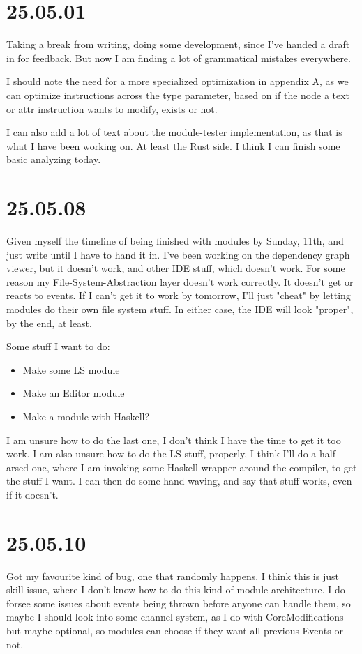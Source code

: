 \section{25.05.01}

Taking a break from writing, doing some development, since I've handed a draft
in for feedback. But now I am finding a lot of grammatical mistakes everywhere.

I should note the need for a more specialized optimization in appendix A, as
we can optimize instructions across the type parameter, based on if the node a
text or attr instruction wants to modify, exists or not.

I can also add a lot of text about the module-tester implementation, as that is
what I have been working on. At least the Rust side. I think I can finish some
basic analyzing today.

\section{25.05.08}

Given myself the timeline of being finished with modules by Sunday, 11th, and
just write until I have to hand it in. I've been working on the dependency graph
viewer, but it doesn't work, and other IDE stuff, which doesn't work. For some
reason my File-System-Abstraction layer doesn't work correctly. It doesn't get
or reacts to events. If I can't get it to work by tomorrow, I'll just "cheat" by
letting modules do their own file system stuff. In either case, the IDE will
look "proper", by the end, at least.

Some stuff I want to do:

\begin{itemize}
  \item Make some LS module
  \item Make an Editor module
  \item Make a module with Haskell?
\end{itemize}

I am unsure how to do the last one, I don't think I have the time to get it too
work. I am also unsure how to do the LS stuff, properly, I think I'll do a
half-arsed one, where I am invoking some Haskell wrapper around the compiler,
to get the stuff I want. I can then do some hand-waving, and say that stuff
works, even if it doesn't.


\section{25.05.10}

Got my favourite kind of bug, one that randomly happens. I think this is just
skill issue, where I don't know how to do this kind of module architecture. I
do forsee some issues about events being thrown before anyone can handle them,
so maybe I should look into some channel system, as I do with CoreModifications
but maybe optional, so modules can choose if they want all previous Events or
not.